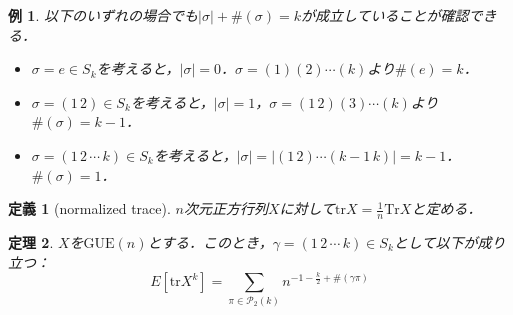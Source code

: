 \documentclass{ltjsarticle}
\theoremstyle{mystyle1}
\newtheorem{dfn}{定義}[section]
\newtheorem{thm}[dfn]{定理}
\theoremstyle{mystyle2}
\newtheorem{example}{例}
\theoremstyle{mystyle3}
\begin{document}
\begin{example}
    以下のいずれの場合でも$|\sigma|+\#(\sigma)=k$が成立していることが確認できる．
    \begin{itemize}
        \item $\sigma=e\in S_k$を考えると，$|\sigma|=0$．$\sigma=(1)(2)\cdots(k)$より$\#(e)=k$．
        \item $\sigma=(1\,2)\in S_k$を考えると，$|\sigma|=1$，$\sigma=(1\,2)(3)\cdots(k)$より$\#(\sigma)=k-1$．
        \item $\sigma=(1\,2\,\cdots\,k)\in S_k$を考えると，$|\sigma|=|(1\,2)\cdots(k-1\,k)|=k-1$．$\#(\sigma)=1$．
    \end{itemize}
\end{example}

\begin{dfn}[normalized trace]
    $n$次元正方行列$X$に対して$\mathrm{tr}X=\frac{1}{n}\mathrm{Tr}X$と定める．
\end{dfn}

\begin{thm}
    $X$を$\mathrm{GUE}(n)$とする．このとき，$\gamma=(1\,2\,\cdots\,k)\in S_k$として以下が成り立つ：
    \begin{equation}
        E[\mathrm{tr}X^k]=\sum_{\pi\in\mathcal{P}_2(k)}n^{-1-\frac{k}{2}+\#(\gamma\pi)}
    \end{equation}
\end{thm}
\end{document}
